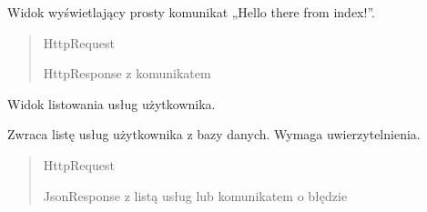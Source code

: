 \documentclass[letterpaper,10pt,polish]{sphinxmanual}
\begin{document}

\begin{fulllineitems}
\label{\detokenize{mainApp:mainApp.views.index}}
\pysigstartsignatures
{}
\pysigstopsignatures
\sphinxAtStartPar
Widok wyświetlający prosty komunikat „Hello there from index!”.
\begin{quote}\begin{description}
\sphinxAtStartPar
{} \textendash{} HttpRequest

\sphinxAtStartPar
HttpResponse z komunikatem

\end{description}\end{quote}

\end{fulllineitems}


\begin{fulllineitems}
\label{\detokenize{mainApp:mainApp.views.list_services}}
\pysigstartsignatures
{}
\pysigstopsignatures
\sphinxAtStartPar
Widok listowania usług użytkownika.

\sphinxAtStartPar
Zwraca listę usług użytkownika z bazy danych.
Wymaga uwierzytelnienia.
\begin{quote}\begin{description}
\sphinxAtStartPar
{} \textendash{} HttpRequest

\sphinxAtStartPar
JsonResponse z listą usług lub komunikatem o błędzie

\end{description}\end{quote}

\end{fulllineitems}

\end{document}
